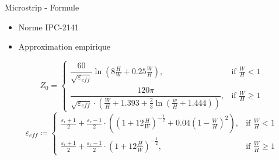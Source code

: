 \begin{frame}{Microstrip - Formule}
    \begin{itemize}
        \item Norme IPC-2141
        \item Approximation empirique
    \end{itemize}
    \pause
    \begin{center}
        \[
            Z_0 =
            \begin{cases} 
                \dfrac{60}{\sqrt{\varepsilon_{eff}}}\ln\left(8\frac{H}{W} + 0.25\frac{W}{H}\right), & \text{if } \frac{W}{H} < 1 \\
                \dfrac{120 \pi}{\sqrt{\varepsilon_{eff}} \cdot \left(\frac{W}{H} + 1.393 + \frac{2}{3}\ln\left(\frac{w}{H} + 1.444\right)\right)}, & \text{if } \frac{W}{H} \geq 1
            \end{cases}
        \]
        \[
            \varepsilon_{eff} \coloneqq
            \begin{cases} 
                \frac{\varepsilon_r + 1}{2} + \frac{\varepsilon_r - 1}{2} \cdot \left(\left(1 + 12 \frac{H}{W}\right)^{-\frac{1}{2}} + 0.04\left(1 - \frac{W}{H}\right)^2\right), & \text{if } \frac{W}{H} < 1 \\
                \frac{\varepsilon_r + 1}{2} + \frac{\varepsilon_r - 1}{2} \cdot \left(1 + 12 \frac{H}{W}\right)^{-\frac{1}{2}}, & \text{if } \frac{W}{H} \geq 1
            \end{cases}
        \]
    \end{center}
\end{frame}


